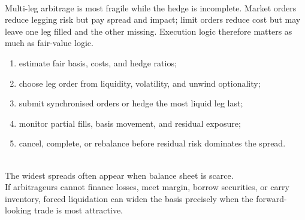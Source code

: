 \begin{caveat} \\
Multi-leg arbitrage is most fragile while the hedge is incomplete. Market orders reduce legging risk but pay spread and impact; limit orders reduce cost but may leave one leg filled and the other missing. Execution logic therefore matters as much as fair-value logic.
\end{caveat}

\begin{process} 
\begin{enumerate}[label=\roman*.]
\setlength{\itemsep}{0pt}
\item estimate fair basis, costs, and hedge ratios;
\item choose leg order from liquidity, volatility, and unwind optionality;
\item submit synchronised orders or hedge the most liquid leg last;
\item monitor partial fills, basis movement, and residual exposure;
\item cancel, complete, or rebalance before residual risk dominates the spread.
\end{enumerate}
\end{process}

\begin{caveat} \\
The widest spreads often appear when balance sheet is scarce.\\
If arbitrageurs cannot finance losses, meet margin, borrow securities, or carry inventory, forced liquidation can widen the basis precisely when the forward-looking trade is most attractive.
\end{caveat}
